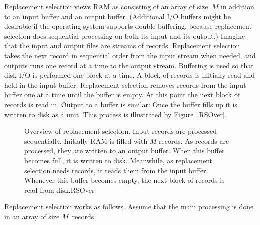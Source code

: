 Replacement selection views RAM as consisting of an array of
size~\(M\) in addition to an input buffer and an output buffer.
(Additional I/O buffers might be desirable if the
operating system
supports double buffering,
because replacement selection does sequential
processing on both its input and its output.)
Imagine that the input and output files are streams of records.
Replacement selection takes the next record in sequential order from the
input stream when needed, and outputs runs one record at a
time to the output stream.
Buffering is used so that disk I/O is performed one block at a time.
A block of records is initially read and held in the input buffer.
Replacement selection removes records from the input buffer one at a 
time until the buffer is empty.
At this point the next block of records is read in.
Output to a buffer is similar:
Once the buffer fills up it is written to disk as a unit.
This process is illustrated by Figure~\ref{RSOver}.

\begin{figure}
\vspace{-\smallskipamount}

{Overview of replacement selection.
Input records are processed sequentially.
Initially RAM is filled with \(M\) records.
As records are processed, they are written to an output buffer.
When this buffer becomes full, it is written to disk.
Meanwhile, as replacement selection needs records, it reads them from
the input buffer.
Whenever this buffer becomes empty, the next block of records is read
from disk.}{RSOver}
\bigskip\smallskip
\end{figure}

Replacement selection works as follows.
Assume that the main processing is done in an array of size \(M\)~records.

